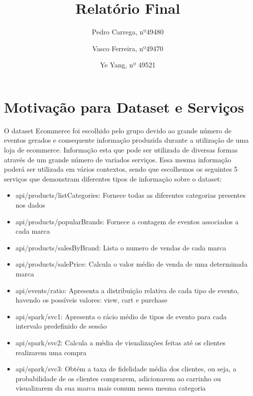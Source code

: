 \documentclass[11pt,a4paper]{article}
\begin{document}
\title{Relatório Final}
\author{Pedro Carrega, nº49480 \and
Vasco Ferreira, nº49470 \and Ye Yang, nº 49521
}


\maketitle

\renewcommand*\contentsname{Indíce}
\tableofcontents
\newpage

\section{Motivação para Dataset e Serviços}

O dataset Ecommerce foi escolhido pelo grupo devido ao grande número de eventos gerados e consequente informação produzida durante a utilização de uma loja de ecommerce. Informação esta que pode ser utilizada de diversas formas através de um grande número de variados serviços. Essa mesma informação poderá ser utilizada em vários contextos, sendo que escolhemos os seguintes 5 serviços que demonstram diferentes tipos de informação sobre o dataset:

\begin{itemize}
  \item api/products/listCategories: Fornece todas as diferentes categorias presentes nos dados
  \item api/products/popularBrands: Fornece a contagem de eventos associados a cada marca
  \item api/products/salesByBrand: Lista o numero de vendas de cada marca
  \item api/products/salePrice: Calcula o valor médio de venda de uma determinada marca
  \item api/events/ratio: Apresenta a distribuição relativa de cada tipo de evento, havendo os possíveis valores: view, cart e purchase
  \item api/spark/svc1: Apresenta o rácio médio de tipos de evento para cada intervalo predefinido de sessão
  \item api/spark/svc2: Calcula a média de visualizações feitas até os clientes realizarem uma compra
  \item api/spark/svc3: Obtém a taxa de fidelidade média dos clientes, ou seja, a probabilidade de os clientes comprarem, adicionarem ao carrinho ou visualizarem da sua marca mais comum nessa mesma categoria
\end{itemize}
\end{document}
